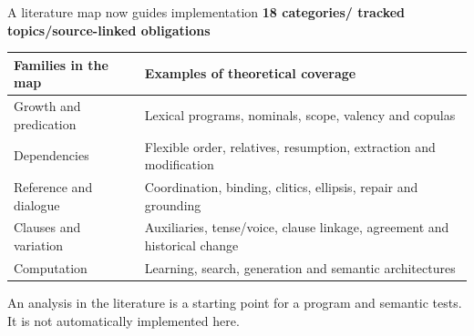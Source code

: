 \documentclass[aspectratio=169,11pt]{beamer}
\newcommand{\tagline}[1]{{\small\color{Accent}\bfseries #1}\par\medskip}
\newcommand{\keypoint}[1]{\begin{block}{}#1\end{block}}
\begin{document}
\begin{frame}{A literature map now guides implementation}
  \color{Ink}
  \tagline{18 categories\quad / tracked topics\quad /\quad source-linked obligations}
  \small
  \begin{tabularx}{\textwidth}{@{}p{39mm}Y@{}}\toprule
    \textbf{Families in the map} & \textbf{Examples of theoretical coverage}\\\midrule
    Growth and predication & Lexical programs, nominals, scope, valency and copulas\\[4pt]
    Dependencies & Flexible order, relatives, resumption, extraction and modification\\[4pt]
    Reference and dialogue & Coordination, binding, clitics, ellipsis, repair and grounding\\[4pt]
    Clauses and variation & Auxiliaries, tense/voice, clause linkage, agreement and historical change\\[4pt]
    Computation & Learning, search, generation and semantic architectures\\\bottomrule
  \end{tabularx}\par
  \vspace{1mm}
  \keypoint{An analysis in the literature is a starting point for a program and semantic tests. It is not automatically implemented here.}
\end{frame}
\end{document}
